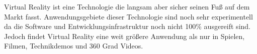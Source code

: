 
Virtual Reality ist eine Technologie die langsam aber sicher seinen Fuß auf dem Markt fasst. Anwendungsgebiete dieser Technologie sind
noch sehr experimentell da die Software und Entwicklungsinfrastruktur noch nicht 100\% ausgereift sind. \\ 
Jedoch findet Virtual Reality eine weit größere Anwendung als nur in Spielen, Filmen, Technikdemos und 360 Grad Videos.

